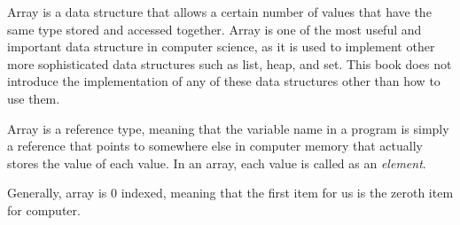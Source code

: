 \documentclass[../main.tex]{subfiles}
\begin{document}
    Array is a data structure that allows a certain number of values that have
    the same type stored and accessed together. Array is one of the most useful
    and important data structure in computer science, as it is used to implement
    other more sophisticated data structures such as list, heap, and set. This
    book does not introduce the implementation of any of these data structures
    other than how to use them.

    Array is a reference type, meaning that the variable name in a program is
    simply a reference that points to somewhere else in computer memory that
    actually stores the value of each value. In an array, each value is called
    as an \emph{element}.

    Generally, array is 0 indexed, meaning that the first item for us is the
    zeroth item for computer.
\end{document}
